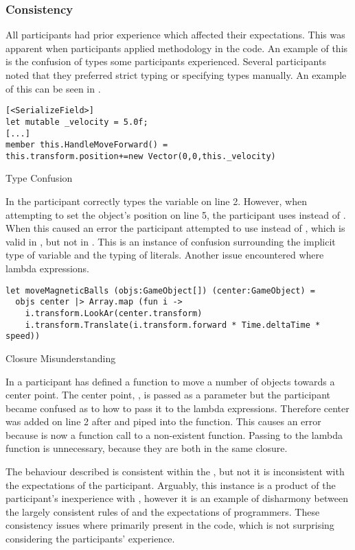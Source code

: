 \subsubsection{Consistency}\label{sec:part-cons} %
All participants had prior \cs experience which affected their expectations. This was apparent when participants applied \cs methodology in the \fs code. An example of this is the confusion of types some participants experienced. Several participants noted that they preferred strict typing or specifying types manually. An example of this can be seen in .

\begin{listing}[H]
\begin{verbatim}
[<SerializeField>]
let mutable _velocity = 5.0f;
[...]
member this.HandleMoveForward() =
this.transform.position+=new Vector(0,0,this._velocity)
\end{verbatim}
\caption{Type Confusion}
\label{lst:type-conf}
\end{listing}

In  the participant correctly types the  variable on line 2. However, when attempting to set the object's position on line 5, the participant uses  instead of . When this caused an error the participant attempted to use  instead of , which is valid in \cs, but not in \fs. This is an instance of confusion surrounding the implicit type of variable and the typing of literals. Another issue encountered where lambda expressions.

\begin{listing}[H]
\begin{verbatim}
let moveMagneticBalls (objs:GameObject[]) (center:GameObject) =
  objs center |> Array.map (fun i ->
    i.transform.LookAr(center.transform)
    i.transform.Translate(i.transform.forward * Time.deltaTime * speed))
\end{verbatim}
\caption{Closure Misunderstanding}
\label{lst:clos-mis}
\end{listing}

In  a participant has defined a function to move a number of objects towards a center point. The center point, , is passed as a parameter but the participant became confused as to how to pass it to the lambda expressions. Therefore center was added on line 2 after  and piped into the  function. This causes an error because  is now a function call to a non-existent function. Passing  to the lambda function is unnecessary, because they are both in the same closure.

The behaviour described is consistent within the \fs, but not it is inconsistent with the expectations of the participant. Arguably, this instance is a product of the participant's inexperience with \fs, however it is an example of disharmony between the largely consistent rules of \fs and the expectations of programmers. These consistency issues where primarily present in the \fs code, which is not surprising considering the participants' experience.
